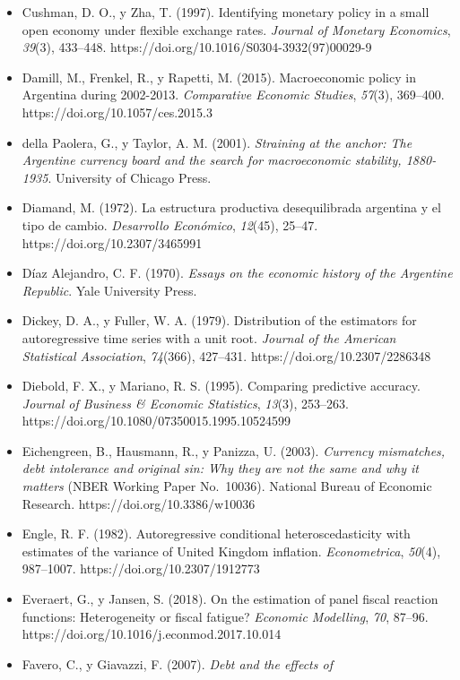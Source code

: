 \begin{itemize}[label={},leftmargin=1.27cm,itemindent=-1.27cm,itemsep=0.6\baselineskip]
\item
  Cushman, D. O., y Zha, T. (1997). Identifying monetary policy in a
  small open economy under flexible exchange rates. \emph{Journal of
  Monetary Economics}, \emph{39}(3), 433--448.
  https://doi.org/10.1016/S0304-3932(97)00029-9
\item
  Damill, M., Frenkel, R., y Rapetti, M. (2015). Macroeconomic policy in
  Argentina during 2002-2013. \emph{Comparative Economic Studies},
  \emph{57}(3), 369--400. https://doi.org/10.1057/ces.2015.3
\item
  della Paolera, G., y Taylor, A. M. (2001). \emph{Straining at the
  anchor: The Argentine currency board and the search for macroeconomic
  stability, 1880-1935}. University of Chicago Press.
\item
  Diamand, M. (1972). La estructura productiva desequilibrada argentina
  y el tipo de cambio. \emph{Desarrollo Económico}, \emph{12}(45),
  25--47. https://doi.org/10.2307/3465991
\item
  Díaz Alejandro, C. F. (1970). \emph{Essays on the economic history of
  the Argentine Republic}. Yale University Press.
\item
  Dickey, D. A., y Fuller, W. A. (1979). Distribution of the estimators
  for autoregressive time series with a unit root. \emph{Journal of the
  American Statistical Association}, \emph{74}(366), 427--431.
  https://doi.org/10.2307/2286348
\item
  Diebold, F. X., y Mariano, R. S. (1995). Comparing predictive
  accuracy. \emph{Journal of Business \& Economic Statistics},
  \emph{13}(3), 253--263. https://doi.org/10.1080/07350015.1995.10524599
\item
  Eichengreen, B., Hausmann, R., y Panizza, U. (2003). \emph{Currency
  mismatches, debt intolerance and original sin: Why they are not the
  same and why it matters} (NBER Working Paper No.~10036). National
  Bureau of Economic Research. https://doi.org/10.3386/w10036
\item
  Engle, R. F. (1982). Autoregressive conditional heteroscedasticity
  with estimates of the variance of United Kingdom inflation.
  \emph{Econometrica}, \emph{50}(4), 987--1007.
  https://doi.org/10.2307/1912773
\item
  Everaert, G., y Jansen, S. (2018). On the estimation of panel fiscal
  reaction functions: Heterogeneity or fiscal fatigue? \emph{Economic
  Modelling}, \emph{70}, 87--96.
  https://doi.org/10.1016/j.econmod.2017.10.014
\item
  Favero, C., y Giavazzi, F. (2007). \emph{Debt and the effects of
}
\end{itemize}
